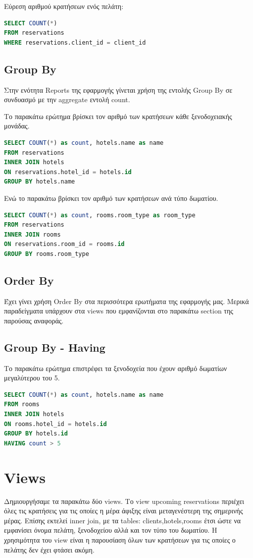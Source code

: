 \documentclass[a4paper,12pt]{article}
\begin{document}
	Εύρεση αριθμού κρατήσεων ενός πελάτη: 
	\begin{lstlisting}[language=SQL]
SELECT COUNT(*) 
FROM reservations 
WHERE reservations.client_id = client_id
	\end{lstlisting}
	
	\subsection{Group By}
	Στην ενότητα Reports της εφαρμογής γίνεται χρήση της εντολής Group By σε συνδυασμό με την aggregate εντολή count.
	
	Το παρακάτω ερώτημα βρίσκει τον αριθμό των κρατήσεων κάθε ξενοδοχειακής μονάδας.
	\begin{lstlisting}[language=SQL]
SELECT COUNT(*) as count, hotels.name as name
FROM reservations
INNER JOIN hotels
ON reservations.hotel_id = hotels.id
GROUP BY hotels.name
	\end{lstlisting}
	Ενώ το παρακάτω βρίσκει τον αριθμό των κρατήσεων ανά τύπο δωματίου.
	\begin{lstlisting}[language=SQL]
SELECT COUNT(*) as count, rooms.room_type as room_type
FROM reservations
INNER JOIN rooms
ON reservations.room_id = rooms.id
GROUP BY rooms.room_type
	\end{lstlisting}
	
	\subsection{Order By}
	Έχει γίνει χρήση Order By στα περισσότερα ερωτήματα της εφαρμογής μας. Μερικά παραδείγματα υπάρχουν στα views που εμφανίζονται στο παρακάτω section της παρούσας αναφοράς.
	
	\subsection{Group By - Having}
	Το παρακάτω ερώτημα επιστρέφει τα ξενοδοχεία που έχουν αριθμό δωματίων μεγαλύτερου του 5.
	\begin{lstlisting}[language=SQL]
SELECT COUNT(*) as count, hotels.name as name
FROM rooms
INNER JOIN hotels
ON rooms.hotel_id = hotels.id
GROUP BY hotels.id
HAVING count > 5
	\end{lstlisting}

\section{Views}
Δημιουργήσαμε τα παρακάτω δύο views.
Το view upcoming reservations περιέχει όλες τις κρατήσεις για τις οποίες η μέρα άφιξης είναι μεταγενέστερη της σημερινής μέρας. Επίσης εκτελεί inner join, με τα tables: clients,hotels,rooms έτσι ώστε να εμφανίσει όνομα πελάτη, ξενοδοχείου αλλά και τον τύπο του δωματίου. Η χρησιμότητα του view είναι η παρουσίαση όλων των κρατήσεων για τις οποίες ο πελάτης δεν έχει φτάσει ακόμη.
\end{document}
